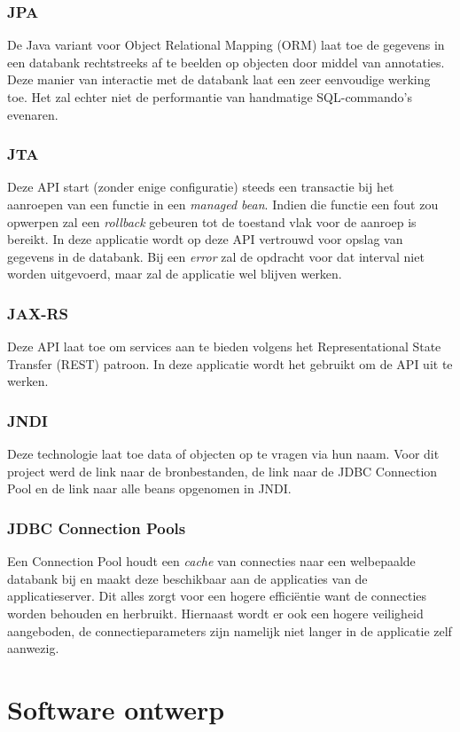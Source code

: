 \documentclass[ps,a4paper,oneside]{report}
\begin{document}
\subsubsection{JPA}
De Java variant voor Object Relational Mapping (ORM) laat toe de gegevens in een databank rechtstreeks af te beelden op objecten door middel van annotaties. Deze manier van interactie met de databank laat een zeer eenvoudige werking toe. Het zal echter niet de performantie van handmatige SQL-commando's evenaren.
\subsubsection{JTA}
Deze API start (zonder enige configuratie) steeds een transactie bij het aanroepen van een functie in een \textit{managed bean}. Indien die functie een fout zou opwerpen zal een \textit{rollback} gebeuren tot de toestand vlak voor de aanroep is bereikt. In deze applicatie wordt op deze API vertrouwd voor opslag van gegevens in de databank.  Bij een \textit{error} zal de opdracht voor dat interval niet worden uitgevoerd, maar zal de applicatie wel blijven werken.
\subsubsection{JAX-RS}
Deze API laat toe om services aan te bieden volgens het Representational State Transfer (REST) patroon. In deze applicatie wordt het gebruikt om de API uit te werken.
\subsubsection{JNDI}
Deze technologie laat toe data of objecten op te vragen via hun naam. Voor dit project werd de link naar de bronbestanden, de link naar de JDBC Connection Pool en de link naar alle beans opgenomen in JNDI.
\subsubsection{JDBC Connection Pools}
Een Connection Pool houdt een \textit{cache} van connecties naar een welbepaalde databank bij en maakt deze beschikbaar aan de applicaties van de applicatieserver. Dit alles zorgt voor een hogere effici\"entie want de connecties worden behouden en herbruikt. Hiernaast wordt er ook een hogere veiligheid aangeboden, de connectieparameters zijn namelijk niet langer in de applicatie zelf aanwezig.
\clearpage
\section{Software ontwerp}
\end{document}
